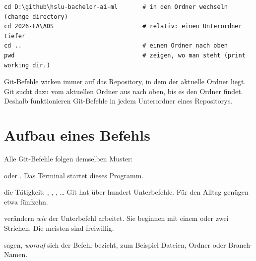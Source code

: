 \begin{lstlisting}[style=befehle]
cd D:\github\hslu-bachelor-ai-ml       # in den Ordner wechseln (change directory)
cd 2026-FA\ADS                         # relativ: einen Unterordner tiefer
cd ..                                  # einen Ordner nach oben
pwd                                    # zeigen, wo man steht (print working dir.)
\end{lstlisting}

Git-Befehle wirken immer auf das Repository, in dem der aktuelle Ordner liegt. Git sucht
dazu vom aktuellen Ordner aus nach oben, bis es den Ordner  findet. Deshalb
funktionieren Git-Befehle in jedem Unterordner eines Repositorys.

\section{Aufbau eines Befehls}

Alle Git-Befehle folgen demselben Muster:

\begin{center}
\end{center}

\begin{description}[style=nextline, leftmargin=1.2cm]
  \item[Programm]  oder . Das Terminal startet dieses Programm.
  \item[Unterbefehl] die Tätigkeit: , , , \ldots{} Git hat
    über hundert Unterbefehle. Für den Alltag genügen etwa fünfzehn.
  \item[Optionen] verändern \emph{wie} der Unterbefehl arbeitet. Sie beginnen mit einem
    oder zwei Strichen. Die meisten sind freiwillig.
  \item[Argumente] sagen, \emph{worauf} sich der Befehl bezieht, zum Beispiel Dateien,
    Ordner oder Branch-Namen.
\end{description}

